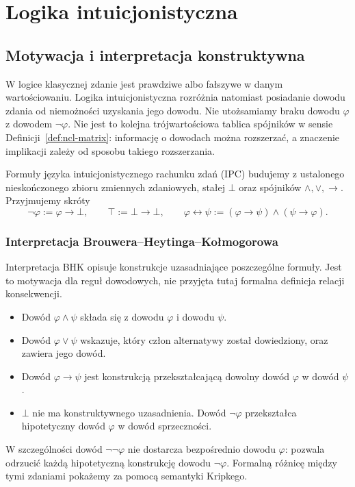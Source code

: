 \chapter{Logika intuicjonistyczna}\label{ch:ncl-intuitionistic}

\section{Motywacja i interpretacja konstruktywna}

W logice klasycznej zdanie jest prawdziwe albo fałszywe
w danym wartościowaniu. Logika intuicjonistyczna
rozróżnia natomiast posiadanie dowodu zdania od
niemożności uzyskania jego dowodu. Nie utożsamiamy
braku dowodu $\varphi$ z dowodem $\neg\varphi$.
Nie jest to kolejna trójwartościowa tablica spójników
w sensie Definicji~\ref{def:ncl-matrix}: informację
o dowodach można rozszerzać, a znaczenie implikacji
zależy od sposobu takiego rozszerzania.

\begin{definicja}
\label{def:ncl-ipc-language}
Formuły języka intuicjonistycznego rachunku zdań
(IPC) budujemy z ustalonego nieskończonego zbioru
zmiennych zdaniowych, stałej $\bot$ oraz spójników
$\wedge,\vee,\to$. Przyjmujemy skróty
\[
 \neg\varphi:=\varphi\to\bot,\qquad
 \top:=\bot\to\bot,\qquad
 \varphi\leftrightarrow\psi:=
 (\varphi\to\psi)\wedge(\psi\to\varphi).
\]
\end{definicja}

\subsection{Interpretacja Brouwera--Heytinga--Kołmogorowa}
Interpretacja BHK opisuje konstrukcje uzasadniające
poszczególne formuły. Jest to motywacja dla reguł
dowodowych, nie przyjęta tutaj formalna definicja
relacji konsekwencji.
\begin{itemize}
\item Dowód $\varphi\wedge\psi$ składa się z dowodu
      $\varphi$ i dowodu $\psi$.
\item Dowód $\varphi\vee\psi$ wskazuje, który człon
      alternatywy został dowiedziony, oraz zawiera jego dowód.
\item Dowód $\varphi\to\psi$ jest konstrukcją
      przekształcającą dowolny dowód $\varphi$
      w dowód $\psi$.
\item $\bot$ nie ma konstruktywnego uzasadnienia.
      Dowód $\neg\varphi$ przekształca hipotetyczny
      dowód $\varphi$ w dowód sprzeczności.
\end{itemize}
W szczególności dowód $\neg\neg\varphi$ nie dostarcza
bezpośrednio dowodu $\varphi$: pozwala odrzucić
każdą hipotetyczną konstrukcję dowodu $\neg\varphi$.
Formalną różnicę między tymi zdaniami pokażemy
za pomocą semantyki Kripkego.

